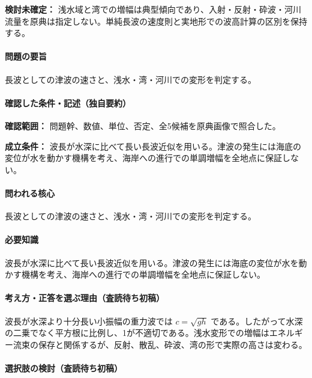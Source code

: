 \par\textbf{検討未確定：} 浅水域と湾での増幅は典型傾向であり、入射・反射・砕波・河川流量を原典は指定しない。単純長波の速度則と実地形での波高計算の区別を保持する。

\paragraph{問題の要旨} 長波としての津波の速さと、浅水・湾・河川での変形を判定する。

\paragraph{確認した条件・記述（独自要約）}\mbox{}\par

\noindent\textbf{確認範囲：} 問題幹、数値、単位、否定、全5候補を原典画像で照合した。\par

\noindent\textbf{成立条件：} 波長が水深に比べて長い長波近似を用いる。津波の発生には海底の変位が水を動かす機構を考え、海岸への進行での単調増幅を全地点に保証しない。\par

\paragraph{問われる核心} 長波としての津波の速さと、浅水・湾・河川での変形を判定する。

\paragraph{必要知識} 波長が水深に比べて長い長波近似を用いる。津波の発生には海底の変位が水を動かす機構を考え、海岸への進行での単調増幅を全地点に保証しない。

\paragraph{考え方・正答を選ぶ理由（査読待ち初稿）} 波長が水深より十分長い小振幅の重力波では \(c=\sqrt{gh}\) である。したがって水深の二乗でなく平方根に比例し、1が不適切である。浅水変形での増幅はエネルギー流束の保存と関係するが、反射、散乱、砕波、湾の形で実際の高さは変わる。

\paragraph{選択肢の検討（査読待ち初稿）}\mbox{}\par


